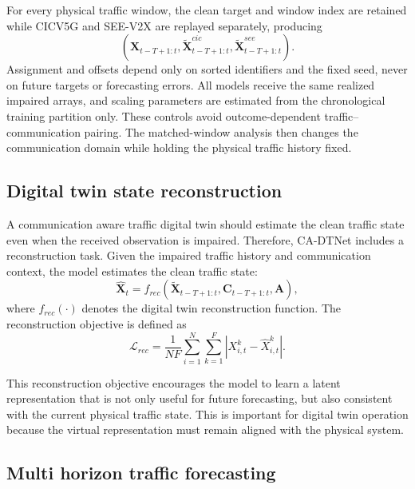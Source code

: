 \documentclass[pdflatex,sn-mathphys-num]{sn-jnl}%
\newenvironment{changed}{\color{blue}}{}
\theoremstyle{thmstyleone}%
\theoremstyle{thmstyletwo}%
\theoremstyle{thmstylethree}%
\begin{document}
\begin{changed}
For every physical traffic window, the clean target and window index are retained while CICV5G and SEE-V2X are replayed separately, producing
\begin{equation}
\left(\mathbf{X}_{t-T+1:t},
\widetilde{\mathbf{X}}^{cic}_{t-T+1:t},
\widetilde{\mathbf{X}}^{see}_{t-T+1:t}\right).
\end{equation}
Assignment and offsets depend only on sorted identifiers and the fixed seed, never on future targets or forecasting errors. All models receive the same realized impaired arrays, and scaling parameters are estimated from the chronological training partition only. These controls avoid outcome-dependent traffic--communication pairing. The matched-window analysis then changes the communication domain while holding the physical traffic history fixed.
\end{changed}

\subsection{Digital twin state reconstruction}

A communication aware traffic digital twin should estimate the clean traffic state even when the received observation is impaired. Therefore, CA-DTNet includes a reconstruction task. Given the impaired traffic history and communication context, the model estimates the clean traffic state:
\begin{equation}
    \widehat{\mathbf{X}}_{t}
    =
    f_{rec}
    \left(
    \widetilde{\mathbf{X}}_{t-T+1:t},
    \mathbf{C}_{t-T+1:t},
    \mathbf{A}
    \right),
\end{equation}
where \(f_{rec}(\cdot)\) denotes the digital twin reconstruction function. The reconstruction objective is defined as
\begin{equation}
    \mathcal{L}_{rec}
    =
    \frac{1}{N F}
    \sum_{i=1}^{N}
    \sum_{k=1}^{F}
    \left|
    X_{i,t}^{k}
    -
    \widehat{X}_{i,t}^{k}
    \right|.
\end{equation}

This reconstruction objective encourages the model to learn a latent representation that is not only useful for future forecasting, but also consistent with the current physical traffic state. This is important for digital twin operation because the virtual representation must remain aligned with the physical system.

\subsection{Multi horizon traffic forecasting}
\end{document}
